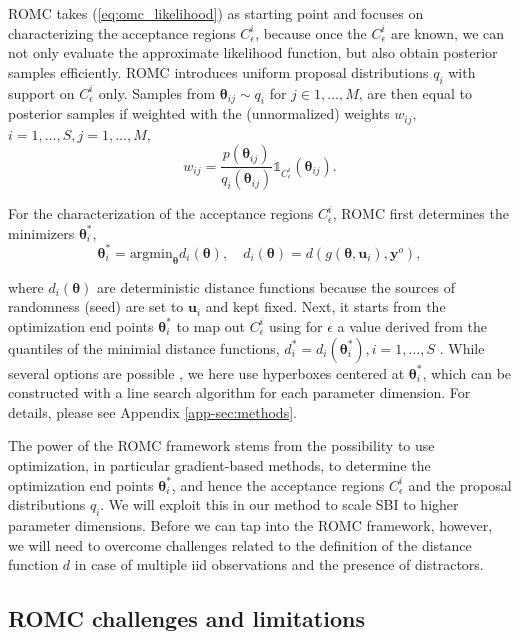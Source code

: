 \documentclass[twoside]{article}
\newcommand{\thb}{\boldsymbol{\theta}}
\newcommand{\ub}{\mathbf{u}}
\newcommand{\data}{\mathbf{y}^o}
\newcommand{\accregioni}{C_{\epsilon}^i}
\begin{document}
ROMC takes (\ref{eq:omc_likelihood}) as starting point and focuses on characterizing the acceptance regions $\accregioni$, because once the $\accregioni$ are known, we can not only evaluate the approximate likelihood function, but also obtain posterior samples efficiently. ROMC introduces uniform proposal distributions $q_i$ with support on $\accregioni$ only. Samples from $\thb_{ij} \sim q_i$ for $j \in 1,\ldots, M$, are then equal to posterior samples if weighted with the (unnormalized) weights $w_{ij}$, $i=1, \ldots, S, j=1, \ldots, M$,
\begin{equation}
w_{ij} = \frac{p(\thb_{ij})}{q_i(\thb_{ij})} \mathbb{1}_{C^i_{\epsilon}}(\thb_{ij}) \label{eq:romc_weight}.
\end{equation}

For the characterization of the acceptance regions $\accregioni$, ROMC first determines the minimizers $\thb_i^*$,
\begin{equation}
 \thb_i^* = \text{argmin}_{\thb} d_i(\thb),\quad d_i(\thb) = d(g(\thb, \ub_i), \data),       
 \label{eq:optim_end_points}
\end{equation}

where $d_i(\thb)$ are deterministic distance functions because the sources of randomness (seed) are set to $\ub_i$ and kept fixed.
Next, it starts from the optimization end points $\thb_i^*$ to map out $\accregioni$ using for $\epsilon$ a value derived from the quantiles of the minimial distance functions, $d_i^*=d_i(\thb_i^*), i=1, \ldots, S$ \citep[see][for details]{ikonomov2020robust}. While several options are possible \citep{ikonomov2020robust}, we here use hyperboxes centered at $\thb_i^*$, which can be constructed with a line search algorithm for each parameter dimension. For details, please see Appendix \ref{app-sec:methods}.

The power of the ROMC framework stems from the possibility to use optimization, in particular gradient-based methods, to determine the optimization end points $\thb_i^*$, and hence the acceptance regions $\accregioni$ and the proposal distributions $q_i$. We will exploit this in our method to scale SBI to higher parameter dimensions. Before we can tap into the ROMC framework, however, we will need to overcome challenges related to the definition of the distance function $d$ in case of multiple iid observations and the presence of distractors.

\subsection{ROMC challenges and limitations}
\label{sec:romc-limitations}
\end{document}
